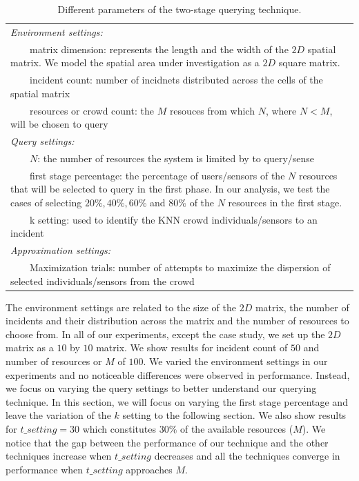 \documentclass{acm_proc_article-sp}
\newcommand{\tabitem}{~~\llap{\textbullet}~~}
\begin{document}
\begin{table}{}
\centering
\begin{tabulary}{0.5\textwidth}{|L|}
\hline
\textit{Environment settings: }\\
\tabitem matrix dimension: represents the length and 
the width of the $2D$ spatial matrix. We model the spatial area under investigation as a $2D$ square matrix.\\
\tabitem incident count: number of incidnets distributed across the cells of the spatial matrix\\
\tabitem resources or crowd count: the $M$ resouces from which $N$, where $N < M$, will be chosen to query\\
\hline
\textit{Query settings:}\\
\tabitem $N$: the number of resources the system is limited by to query/sense \\
\tabitem first stage percentage: the percentage of users/sensors of the $N$ resources that will be selected to query in the first phase. In our analysis, we test the cases of selecting $20\%, 40\%, 60\%$ and $80\%$ of the $N$ resources in the first stage.\\
\tabitem k setting: used to identify the KNN crowd individuals/sensors to an incident\\
\hline
\textit{Approximation settings: }\\
\tabitem Maximization trials: number of attempts to maximize the dispersion of selected individuals/sensors from the crowd\\
\hline
\end{tabulary}  
\caption{Different parameters of the two-stage querying technique.}
\label{table:systemParameters}
\end{table}

The environment settings are related to the size of the $2D$ matrix, the number of incidents and their distribution across the matrix and the number of resources to choose from. In all of our experiments, except the case study, we set up the $2D$ matrix as a $10$ by $10$ matrix. We show results for incident count of $50$ and  number of resources or $M$ of $100$. We varied the environment settings in our experiments and no noticeable differences were observed in performance. Instead, we focus on varying the query settings to better understand our querying technique. In this section, we will focus on varying the first stage percentage and leave the variation of the $k$ setting to the following section. We also show results for $t\_setting = 30$ which constitutes $30\%$ of the available resources ($M$). We notice that the gap between the performance of our technique and the other techniques increase when $t\_setting$ decreases and all the techniques converge in performance when $t\_setting$ approaches $M$. \par
  
\end{document}
